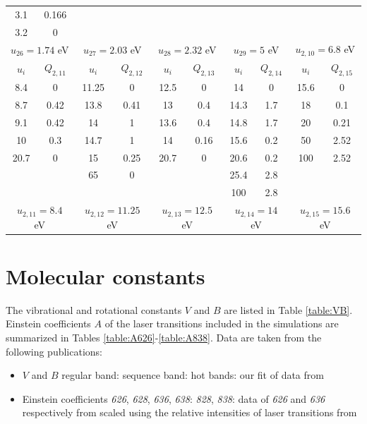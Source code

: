 \documentclass{report}
\begin{document}
\begin{appendices}
\begin{table}
\begin{tabular}{|c|c||c|c||c|c||c|c||c|c|}
3.1  & 0.166  &       &       &       &       &      &      &      &       \\
3.2  & 0      &       &       &       &       &      &      &      &       \\
\multicolumn{2}{|c||}{$u_{26}=1.74$ eV} &
\multicolumn{2}{c||}{$u_{27}=2.03$ eV} &
\multicolumn{2}{c||}{$u_{28}=2.32$ eV} &
\multicolumn{2}{c||}{$u_{29}=5$ eV} &
\multicolumn{2}{c|}{$u_{2,10}=6.8$ eV}\\
\hline
\hline 
$u_i$ & $Q_{2,11}$ & $u_i$ & $Q_{2,12}$ & $u_i$ & $Q_{2,13}$ & $u_i$ & $Q_{2,14}$ & $u_i$ & $Q_{2,15}$ \\                                                                             
\hline
8.4  & 0      & 11.25 & 0     & 12.5  & 0     & 14   & 0    & 15.6 & 0     \\
8.7  & 0.42   & 13.8  & 0.41  & 13    & 0.4   & 14.3 & 1.7  & 18   & 0.1   \\
9.1  & 0.42   & 14    & 1     & 13.6  & 0.4   & 14.8 & 1.7  & 20   & 0.21  \\
10   & 0.3    & 14.7  & 1     & 14    & 0.16  & 15.6 & 0.2  & 50   & 2.52  \\
20.7 & 0      & 15    & 0.25  & 20.7  & 0     & 20.6 & 0.2  & 100  & 2.52  \\
     &        & 65    & 0     &       &       & 25.4 & 2.8  &      &       \\
     &        &       &       &       &       & 100  & 2.8  &      &       \\
\multicolumn{2}{|c||}{$u_{2,11}=8.4$ eV} &
\multicolumn{2}{c||}{$u_{2,12}=11.25$ eV} &
\multicolumn{2}{c||}{$u_{2,13}=12.5$ eV} &
\multicolumn{2}{c||}{$u_{2,14}=14$ eV} &
\multicolumn{2}{c|}{$u_{2,15}=15.6$ eV}\\
\hline 
\end{tabular}
\end{table}


\chapter{Molecular constants}
\label{appendix:molecular_constants}

The vibrational and rotational constants $V$ and $B$ are listed in Table \ref{table:VB}. Einstein coefficients $A$ of the laser transitions included in the simulations are summarized in Tables \ref{table:A626}-\ref{table:A838}. Data are taken from the following publications:

\begin{itemize}
\item $V$ and $B$
\subitem regular band: \cite{Witteman-1987}
\subitem sequence band: \cite{Maki-1994}
\subitem hot bands: our fit of data from \cite{Rothman-2009}
\item Einstein coefficients
\subitem \textit{626}, \textit{628}, \textit{636}, \textit{638}: \cite{Rothman-2009}
\subitem \textit{828}, \textit{838}: data of \textit{626} and \textit{636} respectively from \cite{Rothman-2009} scaled using the relative intensities of laser transitions from \cite{Freed-1982}
\end{itemize}


\end{appendices}
\end{document}

